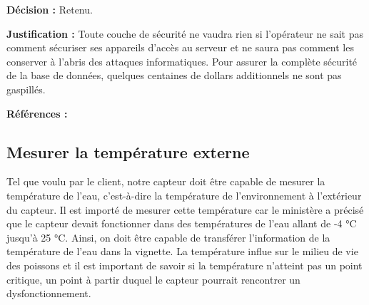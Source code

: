 \textbf{Décision :}  Retenu.

\textbf{Justification :}  Toute couche de sécurité ne vaudra rien si l’opérateur ne sait pas comment sécuriser ses appareils d’accès au serveur et ne saura pas comment les conserver à l’abris des attaques informatiques. Pour assurer la complète sécurité de la base de données, quelques centaines de dollars additionnels ne sont pas gaspillés.

\textbf{Références :} \cite{itspecialist}
\cite{itspecialist}

\begin{table}[!htb]
\footnotesize
\centering
{}
\caption{Faisabilité des concepts pour assurer un accès sécurisé}
\label{t:Decision_re8guler}
\end{table}


\subsection{Mesurer la température externe} 
Tel que voulu par le client, notre capteur doit être capable de mesurer la température de l’eau, c’est-à-dire la température de l’environnement à l’extérieur du capteur. Il est importé de mesurer cette température car le ministère a précisé que le capteur devait fonctionner dans des températures de l’eau allant de -4 °C jusqu’à 25 °C. Ainsi, on doit être capable de transférer l’information de la température de l’eau dans la vignette. La température influe sur le milieu de vie des poissons et il est important de savoir si la température n’atteint pas un point critique, un point à partir duquel le capteur pourrait rencontrer un dysfonctionnement. 


